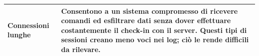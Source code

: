 \begin{center}
\begin{longtable}{|p{}|p{}|}
    Connessioni lunghe &  
    Consentono a un sistema compromesso di ricevere comandi ed esfiltrare dati senza 
    dover effettuare costantemente il check-in con il server. %
    Questi tipi di sessioni creano meno voci nei log; ciò le rende difficili da rilevare. 
    \\
    \hline  

\end{longtable}
\end{center}
